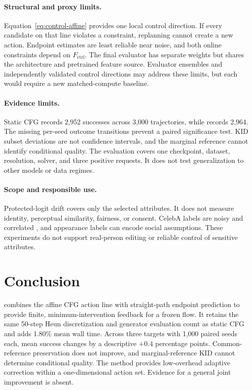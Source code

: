 \documentclass[10pt,twocolumn,letterpaper]{article}
\begin{document}
\paragraph{Structural and proxy limits.}
Equation~\eqref{eq:control-affine} provides one local control direction. If
every candidate on that line violates a constraint, replanning cannot create a
new action. Endpoint estimates are least reliable near noise, and both online
constraints depend on $F_{\mathrm{ctrl}}$. The final evaluator has separate
weights but shares the architecture and pretrained feature source. Evaluator
ensembles and independently validated control directions may address these
limits, but each would require a new matched-compute baseline.

\paragraph{Evidence limits.}
Static CFG records 2,952 successes across 3,000 trajectories, while \method
records 2,964. The missing per-seed outcome transitions prevent a paired
significance test. KID subset deviations are not confidence intervals, and the
marginal reference cannot identify conditional quality. The evaluation covers
one checkpoint, dataset, resolution, solver, and three positive requests. It
does not test generalization to other models or data regimes.

\paragraph{Scope and responsible use.}
Protected-logit drift covers only the selected attributes. It does not measure
identity, perceptual similarity, fairness, or consent. CelebA labels are noisy
and correlated \cite{wu2023celeba}, and appearance labels can encode social
assumptions. These experiments do not support real-person editing or reliable
control of sensitive attributes.

\section{Conclusion}

\method combines the affine CFG action line with straight-path endpoint
prediction to provide finite, minimum-intervention feedback for a frozen flow.
It retains the same 50-step Heun discretization and generator evaluation count
as static CFG and adds 1.80\% mean wall time. Across three targets with 1,000
paired seeds each, mean success
changes by a descriptive $+0.4$ percentage points. Common-reference
preservation does not improve, and marginal-reference KID cannot determine
conditional quality. The method provides low-overhead adaptive correction
within a one-dimensional action set. Evidence for a general joint improvement
is absent.
\end{document}
